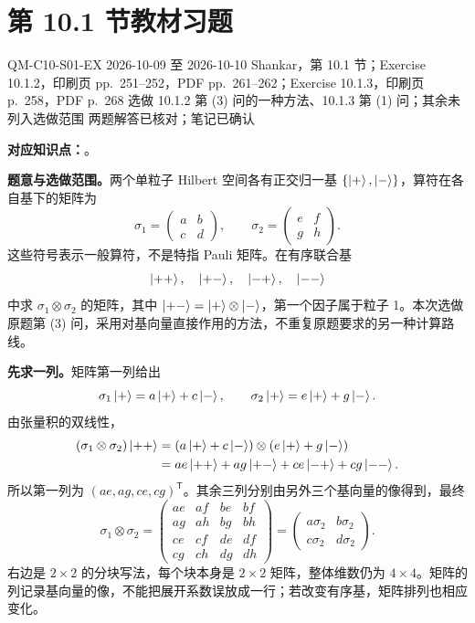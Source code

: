 \section{第 10.1 节教材习题}
\label{exercise-set:QM-C10-S01}
\exercisemeta
  {QM-C10-S01-EX}
  {2026-10-09 至 2026-10-10}
  {Shankar，第 10.1 节；Exercise 10.1.2，印刷页 pp.~251--252，PDF pp.~261--262；Exercise 10.1.3，印刷页 p.~258，PDF p.~268}
  {选做 10.1.2 第 (3) 问的一种方法、10.1.3 第 (1) 问；其余未列入选做范围}
  {两题解答已核对；笔记已确认}

\textbf{对应知识点：}。

\textbf{题意与选做范围。}两个单粒子 Hilbert 空间各有正交归一基 $\{\left|+\right\rangle ,\left|-\right\rangle\}$，算符在各自基下的矩阵为
\begin{equation}
  \sigma_1=\begin{pmatrix}a&b\\c&d\end{pmatrix},\qquad
  \sigma_2=\begin{pmatrix}e&f\\g&h\end{pmatrix}.
\end{equation}
这些符号表示一般算符，不是特指 Pauli 矩阵。在有序联合基
\begin{equation}
  \left|++\right\rangle,\quad\left|+-\right\rangle,\quad\left|-+\right\rangle,\quad\left|--\right\rangle
\end{equation}
中求 $\sigma_1\otimes\sigma_2$ 的矩阵，其中 $\left|+-\right\rangle=\left|+\right\rangle\otimes\left|-\right\rangle$，第一个因子属于粒子 1。本次选做原题第 (3) 问，采用对基向量直接作用的方法，不重复原题要求的另一种计算路线。

\begin{checkedsolution}
\textbf{先求一列。}矩阵第一列给出
\begin{equation}
  \sigma_1\left|+\right\rangle=a\left|+\right\rangle+c\left|-\right\rangle,\qquad
  \sigma_2\left|+\right\rangle=e\left|+\right\rangle+g\left|-\right\rangle.
\end{equation}
由张量积的双线性，
\begin{align}
  (\sigma_1\otimes\sigma_2)\left|++\right\rangle
   &=(a\left|+\right\rangle+c\left|-\right\rangle)\otimes(e\left|+\right\rangle+g\left|-\right\rangle)\notag\\
   &=ae\left|++\right\rangle+ag\left|+-\right\rangle+ce\left|-+\right\rangle+cg\left|--\right\rangle.
\end{align}
所以第一列为 $(ae,ag,ce,cg)^{\mathsf T}$。其余三列分别由另外三个基向量的像得到，最终
\begin{equation}
  \boxed{\sigma_1\otimes\sigma_2=
    \begin{pmatrix}
      ae&af&be&bf\\
      ag&ah&bg&bh\\
      ce&cf&de&df\\
      cg&ch&dg&dh
    \end{pmatrix}
    =\begin{pmatrix}
      a\sigma_2&b\sigma_2\\c\sigma_2&d\sigma_2
    \end{pmatrix}}.
\end{equation}
右边是 $2\times2$ 的分块写法，每个块本身是 $2\times2$ 矩阵，整体维数仍为 $4\times4$。矩阵的列记录基向量的像，不能把展开系数误放成一行；若改变有序基，矩阵排列也相应变化。
\end{checkedsolution}

